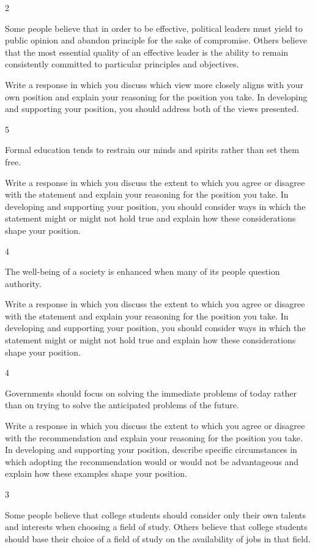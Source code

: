 \documentclass[]{article}
\begin{document}
2

Some people believe that in order to be effective, political leaders
must yield to public opinion and abandon principle for the sake of
compromise. Others believe that the most essential quality of an
effective leader is the ability to remain consistently committed to
particular principles and objectives.

Write a response in which you discuss which view more closely aligns
with your own position and explain your reasoning for the position you
take. In developing and supporting your position, you should address
both of the views presented.

5

Formal education tends to restrain our minds and spirits rather than set
them free.

Write a response in which you discuss the extent to which you agree or
disagree with the statement and explain your reasoning for the position
you take. In developing and supporting your position, you should
consider ways in which the statement might or might not hold true and
explain how these considerations shape your position.

4

The well-being of a society is enhanced when many of its people question
authority.

Write a response in which you discuss the extent to which you agree or
disagree with the statement and explain your reasoning for the position
you take. In developing and supporting your position, you should
consider ways in which the statement might or might not hold true and
explain how these considerations shape your position.

4

Governments should focus on solving the immediate problems of today
rather than on trying to solve the anticipated problems of the future.

Write a response in which you discuss the extent to which you agree or
disagree with the recommendation and explain your reasoning for the
position you take. In developing and supporting your position, describe
specific circumstances in which adopting the recommendation would or
would not be advantageous and explain how these examples shape your
position.

3

Some people believe that college students should consider only their own
talents and interests when choosing a field of study. Others believe
that college students should base their choice of a field of study on
the availability of jobs in that field.
\end{document}
